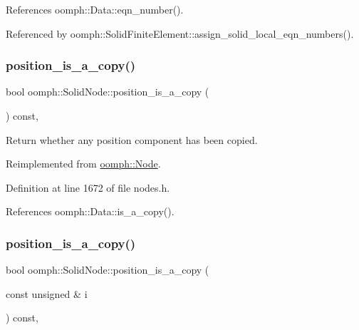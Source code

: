 References oomph\+::\+Data\+::eqn\+\_\+number().



Referenced by oomph\+::\+Solid\+Finite\+Element\+::assign\+\_\+solid\+\_\+local\+\_\+eqn\+\_\+numbers().

\mbox{\label{classoomph_1_1SolidNode_aa8d9a8e77ccc142be77767b33c09532a}} 
\subsubsection{\texorpdfstring{position\+\_\+is\+\_\+a\+\_\+copy()}{position\_is\_a\_copy()}\hspace{0.1cm}{\footnotesize\ttfamily [1/2]}}
{\footnotesize\ttfamily bool oomph\+::\+Solid\+Node\+::position\+\_\+is\+\_\+a\+\_\+copy (\begin{DoxyParamCaption}{ }\end{DoxyParamCaption}) const\hspace{0.3cm}{\ttfamily [inline]}, {\ttfamily [virtual]}}



Return whether any position component has been copied. 



Reimplemented from \hyperlink{classoomph_1_1Node_a80fe9192b35baa5321e8d0ffba4b8b8a}{oomph\+::\+Node}.



Definition at line 1672 of file nodes.\+h.



References oomph\+::\+Data\+::is\+\_\+a\+\_\+copy().

\mbox{\label{classoomph_1_1SolidNode_aa20d88cc797c6635bfd634376c177d87}} 
\subsubsection{\texorpdfstring{position\+\_\+is\+\_\+a\+\_\+copy()}{position\_is\_a\_copy()}\hspace{0.1cm}{\footnotesize\ttfamily [2/2]}}
{\footnotesize\ttfamily bool oomph\+::\+Solid\+Node\+::position\+\_\+is\+\_\+a\+\_\+copy (\begin{DoxyParamCaption}\item[{const unsigned \&}]{i }\end{DoxyParamCaption}) const\hspace{0.3cm}{\ttfamily [inline]}, {\ttfamily [virtual]}}



